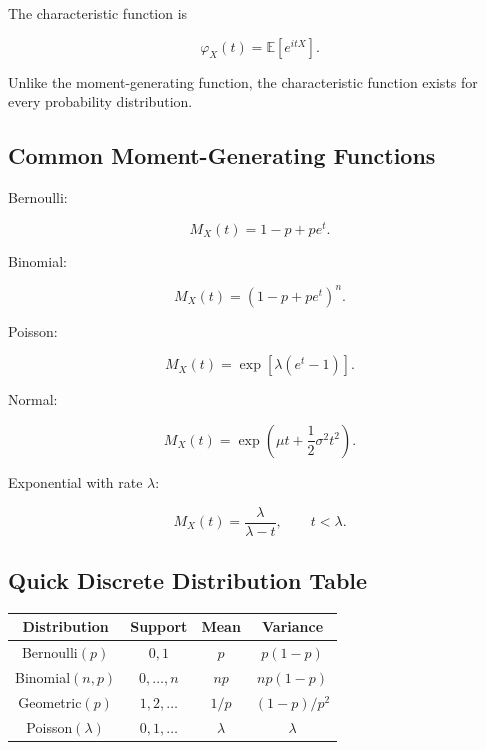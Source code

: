 The characteristic function is

\[
\boxed{
\varphi_X(t)
=
\mathbb{E}[e^{itX}].
}
\]

Unlike the moment-generating function, the characteristic function exists for
every probability distribution.

\subsection{Common Moment-Generating Functions}
\label{subsec:common-mgf-table}

Bernoulli:

\[
\boxed{
M_X(t)
=
1-p+pe^t.
}
\]

Binomial:

\[
\boxed{
M_X(t)
=
(1-p+pe^t)^n.
}
\]

Poisson:

\[
\boxed{
M_X(t)
=
\exp
\left[
\lambda(e^t-1)
\right].
}
\]

Normal:

\[
\boxed{
M_X(t)
=
\exp
\left(
\mu t+\frac12\sigma^2t^2
\right).
}
\]

Exponential with rate \(\lambda\):

\[
\boxed{
M_X(t)
=
\frac{
\lambda
}{
\lambda-t
},
\qquad
t<\lambda.
}
\]

\subsection{Quick Discrete Distribution Table}
\label{subsec:quick-discrete-distribution-table}

\begin{center}
\begin{tabular}{c|c|c|c}
\textbf{Distribution}
&
\textbf{Support}
&
\textbf{Mean}
&
\textbf{Variance}
\\ \hline

Bernoulli\((p)\)
&
\(0,1\)
&
\(p\)
&
\(p(1-p)\)
\\

Binomial\((n,p)\)
&
\(0,\ldots,n\)
&
\(np\)
&
\(np(1-p)\)
\\

Geometric\((p)\)
&
\(1,2,\ldots\)
&
\(1/p\)
&
\((1-p)/p^2\)
\\

Poisson\((\lambda)\)
&
\(0,1,\ldots\)
&
\(\lambda\)
&
\(\lambda\)
\end{tabular}
\end{center}

